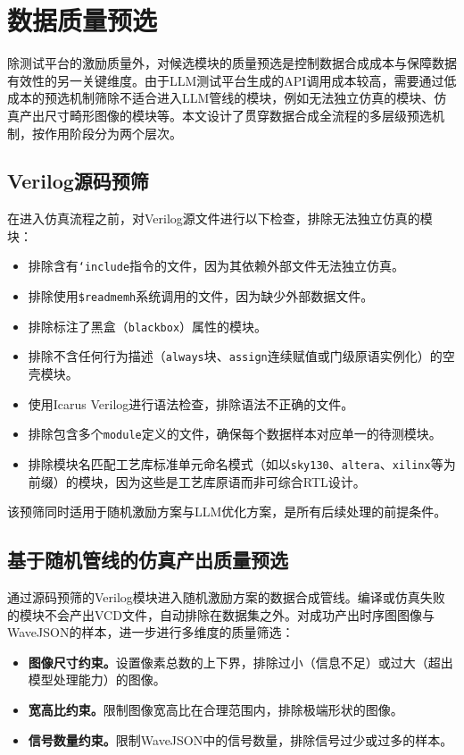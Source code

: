 \section{数据质量预选}

除测试平台的激励质量外，对候选模块的质量预选是控制数据合成成本与保障数据有效性的另一关键维度。由于LLM测试平台生成的API调用成本较高，需要通过低成本的预选机制筛除不适合进入LLM管线的模块，例如无法独立仿真的模块、仿真产出尺寸畸形图像的模块等。本文设计了贯穿数据合成全流程的多层级预选机制，按作用阶段分为两个层次。

\subsection{Verilog源码预筛}

在进入仿真流程之前，对Verilog源文件进行以下检查，排除无法独立仿真的模块：
\begin{itemize}
  \item 排除含有\texttt{`include}指令的文件，因为其依赖外部文件无法独立仿真。
  \item 排除使用\texttt{\$readmemh}系统调用的文件，因为缺少外部数据文件。
  \item 排除标注了黑盒（\texttt{blackbox}）属性的模块。
  \item 排除不含任何行为描述（\texttt{always}块、\texttt{assign}连续赋值或门级原语实例化）的空壳模块。
  \item 使用Icarus Verilog进行语法检查，排除语法不正确的文件。
  \item 排除包含多个\texttt{module}定义的文件，确保每个数据样本对应单一的待测模块。
  \item 排除模块名匹配工艺库标准单元命名模式（如以\texttt{sky130}、\texttt{altera}、\texttt{xilinx}等为前缀）的模块，因为这些是工艺库原语而非可综合RTL设计。
\end{itemize}

该预筛同时适用于随机激励方案与LLM优化方案，是所有后续处理的前提条件。

\subsection{基于随机管线的仿真产出质量预选}

通过源码预筛的Verilog模块进入随机激励方案的数据合成管线。编译或仿真失败的模块不会产出VCD文件，自动排除在数据集之外。对成功产出时序图图像与WaveJSON的样本，进一步进行多维度的质量筛选：
\begin{itemize}
  \item \textbf{图像尺寸约束。}设置像素总数的上下界，排除过小（信息不足）或过大（超出模型处理能力）的图像。
  \item \textbf{宽高比约束。}限制图像宽高比在合理范围内，排除极端形状的图像。
  \item \textbf{信号数量约束。}限制WaveJSON中的信号数量，排除信号过少或过多的样本。
\end{itemize}


